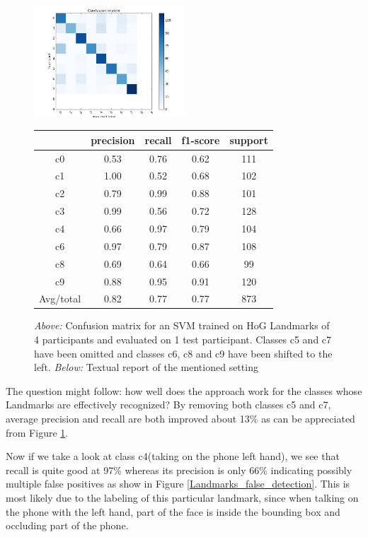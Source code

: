 \documentclass[10pt,twocolumn,letterpaper]{article}
\begin{document}
\begin{figure}[h]
	\centering
	\includegraphics[width=0.5\textwidth]{mult_HOG/4c01234689matComparable}
	\begin{tabular}{c||c|c|c|c}
		& precision&recall&f1-score&support\\	\hline
		c0&0.53&0.76&0.62&111\\
		c1&1.00&0.52&0.68&102\\
		c2&0.79&0.99&0.88&101\\
		c3&0.99&0.56&0.72&128\\
		c4&0.66&0.97&0.79&104\\
		c6&0.97&0.79&0.87&108\\
		c8&0.69&0.64&0.66&99\\
		c9&0.88&0.95&0.91&120\\ \hline
		Avg/total &0.82&0.77& 0.77 &873
	\end{tabular}
	\caption{\textit{Above:} Confusion matrix for an SVM trained on HoG Landmarks of 4 participants and evaluated on 1 test participant. Classes c5 and c7 have been omitted and classes c6, c8 and c9 have been shifted to the left. \textit{Below:} Textual report of the mentioned setting}
	\label{Landmarks_4no5no7}
\end{figure}

The question might follow: how well does the approach work for the classes whose Landmarks are effectively recognized? By removing both classes c5 and c7, average precision and recall are both improved about 13\% as can be appreciated from Figure \ref{Landmarks_4no5no7}. 

Now if we take a look at class c4(taking on the phone left hand), we see that recall is quite good at 97\% whereas its precision is only 66\% indicating possibly multiple false positives as show in Figure \ref{Landmarks_false_detection}. This is most likely due to the labeling of this particular landmark, since when talking on the phone with the left hand, part of the face is inside the bounding box and occluding part of the phone.
\end{document}
